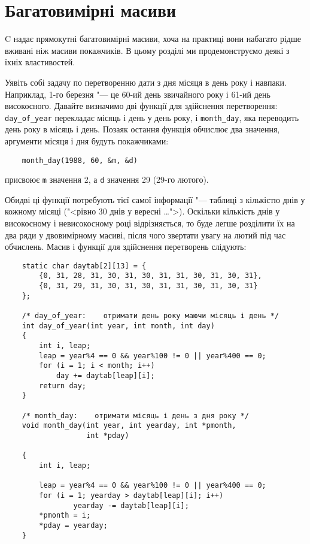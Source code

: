\documentclass[a4paper,12pt]{book}
\begin{document}
\section{Багатовимірні масиви}


  C надає прямокутні багатовимірні масиви, хоча на практиці вони набагато рідше
  вживані ніж масиви покажчиків. В цьому розділі ми продемонструємо деякі з їхніх
  властивостей.

  Уявіть собі задачу по перетворенню дати з дня місяця в день року і навпаки. Наприклад,
  1-го березня "--- це 60-ий день звичайного року і 61-ий день високосного. Давайте
  визначимо дві функції для здійснення перетворення: \texttt{day\_of\_year} перекладає
  місяць і день у день року, і \texttt{month\_day}, яка переводить день року в місяць і
  день. Позаяк остання функція обчислює два значення, аргументи місяця і дня будуть
  покажчиками:
  \begin{verbatim}
    month_day(1988, 60, &m, &d)
  \end{verbatim}
  присвоює \texttt{m} значення 2, а \texttt{d} значення 29 (29-го лютого).

  Обидві ці функції потребують тієї самої інформації "--- таблиці з кількістю днів у
  кожному місяці ("<рівно 30 днів у вересні \ldots">). Оскільки кількість днів у
  високосному і невисокосному році відрізняється, то буде легше розділити їх на два ряди у
  двовимірному масиві, після чого звертати увагу на лютий під час обчислень. Масив і
  функції для здійснення перетворень слідують:
  \begin{verbatim}
    static char daytab[2][13] = {
        {0, 31, 28, 31, 30, 31, 30, 31, 31, 30, 31, 30, 31},
        {0, 31, 29, 31, 30, 31, 30, 31, 31, 30, 31, 30, 31}
    };

    /* day_of_year:    отримати день року маючи місяць і день */
    int day_of_year(int year, int month, int day)
    {
        int i, leap;
        leap = year%4 == 0 && year%100 != 0 || year%400 == 0;
        for (i = 1; i < month; i++)
            day += daytab[leap][i];
        return day;
    }

    /* month_day:    отримати місяць і день з дня року */
    void month_day(int year, int yearday, int *pmonth,
                   int *pday)

    {
        int i, leap;

        leap = year%4 == 0 && year%100 != 0 || year%400 == 0;
        for (i = 1; yearday > daytab[leap][i]; i++)
                yearday -= daytab[leap][i];
        *pmonth = i;
        *pday = yearday;
    }
  \end{verbatim}
\end{document}
